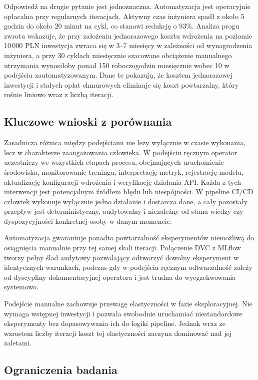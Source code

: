 Odpowiedź na drugie pytanie jest jednoznaczna. Automatyzacja jest operacyjnie opłacalna przy regularnych iteracjach. Aktywny czas inżyniera spadł z około 5 godzin do około 20 minut na cykl, co stanowi redukcję o 93\%. Analiza progu zwrotu wskazuje, że przy założeniu jednorazowego kosztu wdrożenia na poziomie 10\,000 PLN inwestycja zwraca się w 3--7 miesięcy w zależności od wynagrodzenia inżyniera, a przy 30 cyklach miesięcznie szacowane obciążenie manualnego utrzymania wynosiłoby ponad 150 roboczogodzin miesięcznie wobec 10 w podejściu zautomatyzowanym. Dane te pokazują, że kosztem jednorazowej inwestycji i stałych opłat chmurowych eliminuje się koszt powtarzalny, który rośnie liniowo wraz z liczbą iteracji.

\subsection{Kluczowe wnioski z porównania}

Zasadnicza różnica między podejściami nie leży wyłącznie w czasie wykonania, lecz w charakterze zaangażowania człowieka. W podejściu ręcznym operator uczestniczy we wszystkich etapach procesu, obejmujących uruchomienie środowiska, monitorowanie treningu, interpretację metryk, rejestrację modelu, aktualizację konfiguracji wdrożenia i weryfikację działania API. Każda z tych interwencji jest potencjalnym źródłem błędu lub niespójności. W pipeline CI/CD człowiek wykonuje wyłącznie jedno działanie i dostarcza dane, a cały pozostały przepływ jest deterministyczny, audytowalny i niezależny od stanu wiedzy czy dyspozycyjności konkretnej osoby w danym momencie.

Automatyzacja gwarantuje ponadto powtarzalność eksperymentów niemożliwą do osiągnięcia manualnie przy tej samej skali iteracji. Połączenie DVC z MLflow tworzy pełny ślad audytowy pozwalający odtworzyć dowolny eksperyment w identycznych warunkach, podczas gdy w podejściu ręcznym odtwarzalność zależy od dyscypliny dokumentacyjnej operatora i jest trudna do wyegzekwowania systemowo.

Podejście manualne zachowuje przewagę elastyczności w fazie eksploracyjnej. Nie wymaga wstępnej inwestycji i pozwala swobodnie uruchamiać niestandardowe eksperymenty bez dopasowywania ich do logiki pipeline. Jednak wraz ze wzrostem liczby iteracji koszt tej elastyczności zaczyna dominować nad jej zaletami.

\subsection{Ograniczenia badania}

